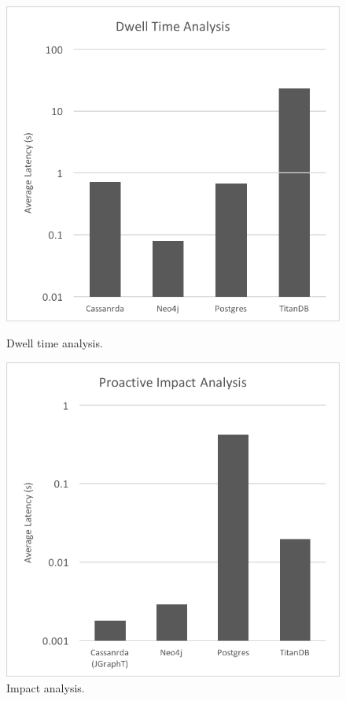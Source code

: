 \documentclass{sig-alternate}
\begin{document}
\begin{figure}
\centering
\begin{minipage}{.5\linewidth}
  \centering
  \includegraphics[width=\linewidth]{adjacent.png}
  \caption{Dwell time analysis.}
  \label{fig:fig1}
\end{minipage}%
\begin{minipage}{.5\linewidth}
  \centering
  \includegraphics[width=\linewidth]{trans_closure.png}
  \caption{Impact analysis.}
  \label{fig:fig2}
  \end{minipage}
\end{figure}
\end{document}
